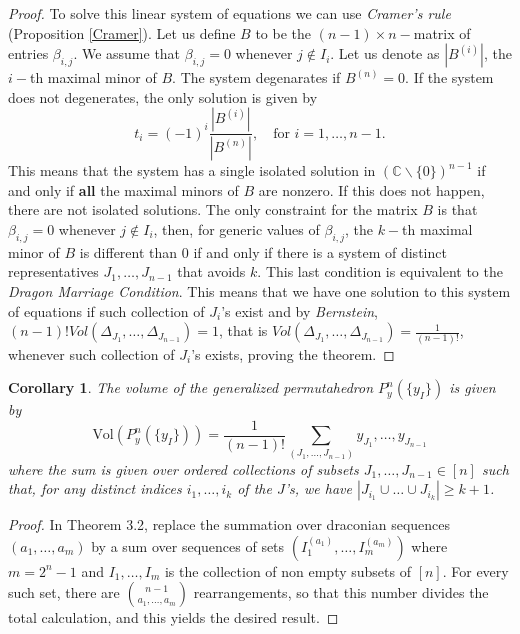 \documentclass[english,11pt]{article}
\newtheorem{corollary}{Corollary}[theorem]
\theoremstyle{definition}
\theoremstyle{definition}
\theoremstyle{definition}
\theoremstyle{remark}
\theoremstyle{definition}
\begin{document}
\begin{proof}
To solve this linear system of equations we can use \textit{Cramer's rule} (Proposition \ref{Cramer}). Let us define $B$ to be the $(n-1)\times n-$matrix of entries $\beta_{i,j}$. We assume that $\beta_{i,j}=0$ whenever $j\not \in I_i$. Let us denote as $|B^{(i)}|$, the $i-$th maximal minor of $B$. The system degenarates if $B^{(n)}=0$. If the system does not degenerates, the only solution is given by 
$$t_i= (-1)^i\frac{|B^{(i)}|}{|B^{(n)}|}, \quad \text{for } i=1, \dots, n-1.$$
This means that the system has a single isolated solution in $(\mathbb{C}\backslash\{0\})^{n-1}$ if and only if \textbf{all} the maximal minors of $B$ are nonzero. If this does not happen, there are not isolated solutions.
The only constraint for the matrix $B$ is that $\beta_{i,j}=0$ whenever $j\not \in I_i$, then, for generic values of $\beta_{i,j}$, the $k-$th maximal minor of $B$ is different than $0$ if and only if there is a system of distinct representatives $J_1, \dots, J_{n-1}$ that avoids $k$.
This last condition is equivalent to the \textit{Dragon Marriage Condition}. This means that we have one solution to this system of equations if such collection of  $J_i$'s exist and by \textit{Bernstein}, $(n-1)!Vol(\Delta_{J_1}, \dots, \Delta_{J_{n-1}})=1$, that is $Vol(\Delta_{J_1}, \dots, \Delta_{J_{n-1}})= \frac{1}{(n-1)!}$, whenever such collection of $J_i$'s exists, proving the theorem.
\end{proof}


\begin{corollary}\label{MainResult}
The volume of the generalized permutahedron $P_y^n(\{y_I\})$ is given by 
$$\text{Vol}\left( P_y^n(\{y_I\}) \right) = \frac{1}{(n-1)!} \sum_{(J_1, \dots, J_{n-1})} y_{J_1}, \dots, y_{J_{n-1}}$$
where the sum is given over ordered collections of subsets $J_1, \dots, J_{n-1} \in [n]$ such that, for any distinct indices $i_1, \dots, i_k$ of the $J$'s, we have $|J_{i_1}\cup \ldots \cup J_{i_k}| \geq k+1$.
\end{corollary}

\begin{proof}
In Theorem 3.2, replace the summation over draconian sequences $(a_1,\ldots,a_m)$ by a sum over sequences of sets $(I_1^{(a_1)},\ldots,I_m^{(a_m)})$ where $m = 2^n-1$ and $I_1,\ldots,I_m$ is the collection of non empty subsets of $[n]$. For every such set, there are $\binom{n-1}{a_1,\ldots,a_m}$ rearrangements, so that this number divides the total calculation, and this yields the desired result.
\end{proof}
\end{document}
